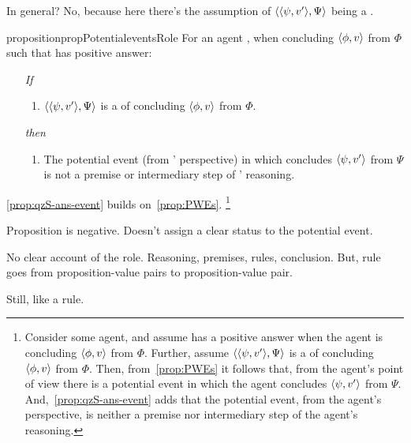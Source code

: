 \begin{note}
  In general?
  No, because here there's the assumption of \(\langle \langle \psi, v' \rangle, \Psi \rangle\) being a \requ{}.

  \begin{restatable}%
    {proposition}{propPotentialeventsRole}
    \label{prop:qzS-ans-event}
    For an agent \vAgent{}, when concluding \(\langle \phi, v \rangle\) from \(\Phi\) such that \qzS{} has positive answer:
    \begin{enumerate}
    \item[\emph{If}]
      \begin{enumerate}[label=\alph*., ref=(\alph*)]
      \item \(\langle \langle \psi, v' \rangle, \Psi \rangle\) is a \requ{} of concluding \(\langle \phi, v \rangle\) from \(\Phi\).
      \end{enumerate}
    \item[\emph{then}]
      \begin{enumerate}[label=\alph*., ref=(\alph*), resume]
      \item
        The potential event (from \vAgent{}' perspective) in which \vAgent{} concludes \(\langle \psi, v' \rangle\) from \(\Psi\) is not a premise or intermediary step of \vAgent{}' reasoning.
      \end{enumerate}
    \end{enumerate}
  \end{restatable}

  \autoref{prop:qzS-ans-event} builds on~\autoref{prop:PWEs}.%
  \footnote{
    Consider some agent, and assume \qzS{} has a positive answer when the agent is concluding \(\langle \phi, v \rangle\) from \(\Phi\).
    Further, assume \(\langle \langle \psi, v' \rangle, \Psi \rangle\) is a \requ{} of concluding \(\langle \phi, v \rangle\) from \(\Phi\).
    Then, from~\autoref{prop:PWEs} it follows that, from the agent's point of view there is a potential event in which the agent concludes \(\langle \psi, v' \rangle\) from \(\Psi\).
    And,~\autoref{prop:qzS-ans-event} adds that the potential event, from the agent's perspective, is neither a premise nor intermediary step of the agent's reasoning.
  }
\end{note}

\begin{note}
  Proposition is negative.
  Doesn't assign a clear status to the potential event.

  No clear account of the role.
  Reasoning, premises, rules, conclusion.
  But, rule goes from proposition-value pairs to proposition-value pair.

  Still, like a rule.
\end{note}


